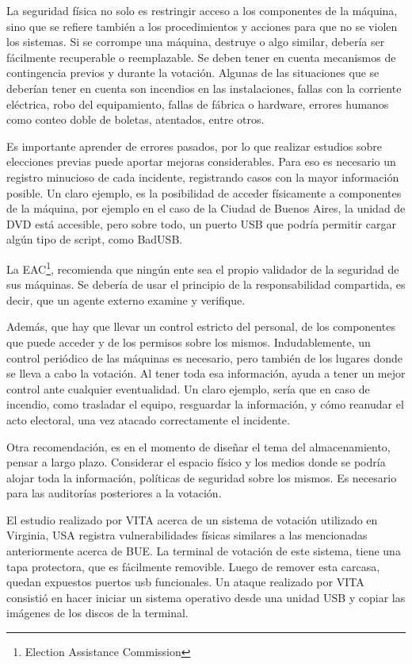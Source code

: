 La seguridad física no solo es restringir acceso a los componentes de la máquina, sino que se refiere también a los procedimientos y acciones para que no se violen los sistemas. Si se corrompe una máquina, destruye o algo similar, debería ser fácilmente recuperable o reemplazable. Se deben tener en cuenta mecanismos de contingencia previos y durante la votación. Algunas de las situaciones que se deberían tener en cuenta son incendios en las instalaciones, fallas con la corriente eléctrica, robo del equipamiento, fallas de fábrica o hardware, errores humanos como conteo doble de boletas, atentados, entre otros.

Es importante aprender de errores pasados, por lo que realizar estudios sobre elecciones previas puede aportar mejoras considerables. Para eso es necesario un registro minucioso de cada incidente, registrando casos con la mayor información posible. Un claro ejemplo, es la posibilidad de acceder físicamente a componentes de la máquina, por ejemplo en el caso de la Ciudad de Buenos Aires, la unidad de DVD está accesible, pero sobre todo, un puerto USB que podría permitir cargar algún tipo de script, como BadUSB\cite{votar}.

La EAC\footnote{Election Assistance Commission}, recomienda que ningún ente sea el propio validador de la seguridad de sus máquinas. Se debería de usar el principio de la responsabilidad compartida, es decir, que un agente externo examine y verifique.

Además, que hay que llevar un control estricto del personal, de los componentes que puede acceder y de los permisos sobre los mismos. Indudablemente, un control periódico de las máquinas es necesario, pero también de los lugares donde se lleva a cabo la votación. Al tener toda esa información, ayuda a tener un mejor control ante cualquier eventualidad. Un claro ejemplo, sería que en caso de incendio, como trasladar el equipo, resguardar la información, y cómo reanudar el acto electoral, una vez atacado correctamente el incidente.

Otra recomendación, es en el momento de diseñar el tema del almacenamiento, pensar a largo plazo. Considerar el espacio físico y los medios donde se podría alojar toda la información, políticas de seguridad sobre los mismos. Es necesario para las auditorías posteriores a la votación.

El estudio realizado por VITA acerca de un sistema de votación utilizado en Virginia, USA\cite{vita} registra vulnerabilidades físicas similares a las mencionadas anteriormente acerca de BUE.
La terminal de votación de este sistema, tiene una tapa protectora, que es fácilmente removible. Luego de remover esta carcasa, quedan expuestos puertos usb funcionales. Un ataque realizado por VITA consistió en hacer iniciar un sistema operativo desde una unidad USB y copiar las imágenes de los discos de la terminal.

